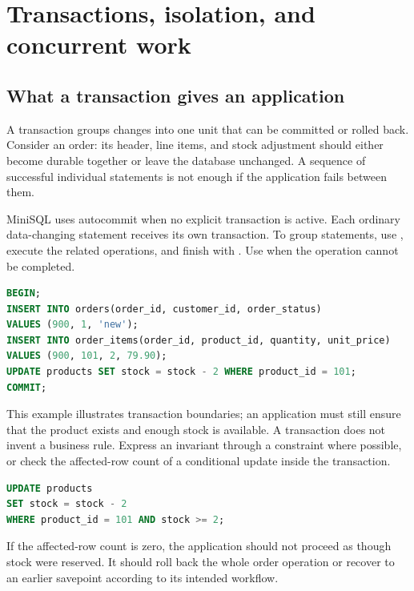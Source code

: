 \chapter{Transactions, isolation, and concurrent work}
\label{ops:transactions}

\section{What a transaction gives an application}

A transaction groups changes into one unit that can be committed or rolled
back. Consider an order: its header, line items, and stock adjustment should
either become durable together or leave the database unchanged. A sequence
of successful individual statements is not enough if the application fails
between them.

MiniSQL uses autocommit when no explicit transaction is active. Each ordinary
data-changing statement receives its own transaction. To group statements,
use , execute the related operations, and finish with
. Use  when the operation cannot be completed.

\begin{lstlisting}[language=SQL]
BEGIN;
INSERT INTO orders(order_id, customer_id, order_status)
VALUES (900, 1, 'new');
INSERT INTO order_items(order_id, product_id, quantity, unit_price)
VALUES (900, 101, 2, 79.90);
UPDATE products SET stock = stock - 2 WHERE product_id = 101;
COMMIT;
\end{lstlisting}

This example illustrates transaction boundaries; an application must still
ensure that the product exists and enough stock is available. A transaction
does not invent a business rule. Express an invariant through a constraint
where possible, or check the affected-row count of a conditional update
inside the transaction.

\begin{lstlisting}[language=SQL]
UPDATE products
SET stock = stock - 2
WHERE product_id = 101 AND stock >= 2;
\end{lstlisting}

If the affected-row count is zero, the application should not proceed as
though stock were reserved. It should roll back the whole order operation
or recover to an earlier savepoint according to its intended workflow.


